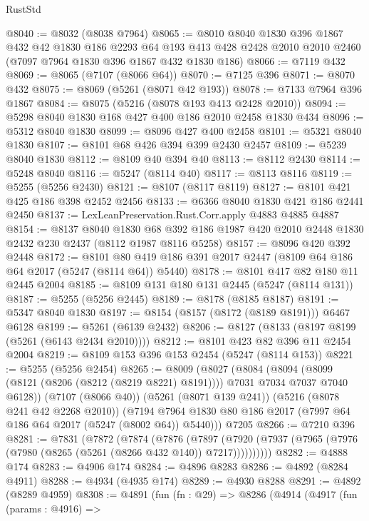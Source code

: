 \begin{lexlean}{RustStd}
\begin{coremodule}
@8040 := @8032 (@8038 @7964)
@8065 := @8010
    @8040
    @1830
    @396
    @1867
    @432
    @42
    @1830
    @186
    @2293
    @64
    @193
    @413
    @428
    @2428
    @2010
    @2010
    @2460
    (@7097 @7964 @1830 @396 @1867 @432 @1830 @186)
@8066 := @7119 @432
@8069 := @8065 (@7107 (@8066 @64))
@8070 := @7125 @396
@8071 := @8070 @432
@8075 := @8069 (@5261 (@8071 @42 @193))
@8078 := @7133 @7964 @396 @1867
@8084 := @8075 (@5216 (@8078 @193 @413 @2428 @2010))
@8094 := @5298 @8040 @1830 @168 @427 @400 @186 @2010 @2458 @1830 @434
@8096 := @5312 @8040 @1830
@8099 := @8096 @427 @400 @2458
@8101 := @5321 @8040 @1830
@8107 := @8101 @68 @426 @394 @399 @2430 @2457
@8109 := @5239 @8040 @1830
@8112 := @8109 @40 @394 @40
@8113 := @8112 @2430
@8114 := @5248 @8040
@8116 := @5247 (@8114 @40)
@8117 := @8113 @8116
@8119 := @5255 (@5256 @2430)
@8121 := @8107 (@8117 @8119)
@8127 := @8101 @421 @425 @186 @398 @2452 @2456
@8133 := @6366 @8040 @1830 @421 @186 @2441 @2450
@8137 := LexLeanPreservation.Rust.Corr.apply @4883 @4885 @4887
@8154 := @8137
    @8040
    @1830
    @68
    @392
    @186
    @1987
    @420
    @2010
    @2448
    @1830
    @2432
    @230
    @2437
    (@8112 @1987 @8116 @5258)
@8157 := @8096 @420 @392 @2448
@8172 := @8101 @80 @419 @186 @391 @2017 @2447 (@8109 @64 @186 @64 @2017 (@5247 (@8114 @64)) @5440)
@8178 := @8101 @417 @82 @180 @11 @2445 @2004
@8185 := @8109 @131 @180 @131 @2445 (@5247 (@8114 @131))
@8187 := @5255 (@5256 @2445)
@8189 := @8178 (@8185 @8187)
@8191 := @5347 @8040 @1830
@8197 := @8154 (@8157 (@8172 (@8189 @8191))) @6467 @6128
@8199 := @5261 (@6139 @2432)
@8206 := @8127 (@8133 (@8197 @8199 (@5261 (@6143 @2434 @2010))))
@8212 := @8101 @423 @82 @396 @11 @2454 @2004
@8219 := @8109 @153 @396 @153 @2454 (@5247 (@8114 @153))
@8221 := @5255 (@5256 @2454)
@8265 := @8009
    (@8027
      (@8084
        (@8094 (@8099 (@8121 (@8206 (@8212 (@8219 @8221) @8191)))) @7031 @7034 @7037 @7040 @6128))
      (@7107 (@8066 @40))
      (@5261 (@8071 @139 @241))
      (@5216 (@8078 @241 @42 @2268 @2010))
      (@7194 @7964 @1830 @80 @186 @2017 (@7997 @64 @186 @64 @2017 (@5247 (@8002 @64)) @5440)))
    @7205
@8266 := @7210 @396
@8281 := @7831
    (@7872
      (@7874
        (@7876
          (@7897 (@7920 (@7937 (@7965 (@7976 (@7980 (@8265 (@5261 (@8266 @432 @140)) @7217))))))))))
@8282 := @4888 @174
@8283 := @4906 @174
@8284 := @4896 @8283
@8286 := @4892 (@8284 @4911)
@8288 := @4934 (@4935 @174)
@8289 := @4930 @8288
@8291 := @4892 (@8289 @4959)
@8308 := @4891
    (fun (fn : @29) =>
    @8286
      (@4914
        (@4917
          (fun (params : @4916) =>

\end{coremodule}
\end{lexlean}
